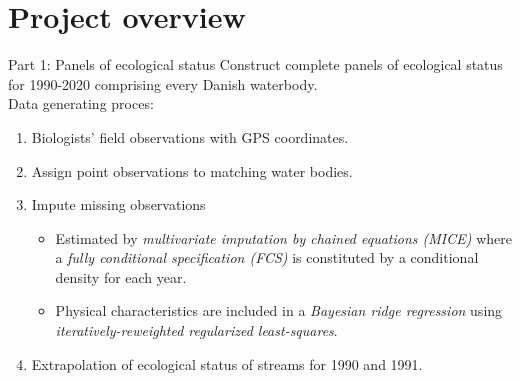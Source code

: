 \section{Project overview}

\begin{frame}{Part 1: Panels of ecological status}
  Construct complete panels of ecological status for 1990-2020 comprising every Danish waterbody.\\\bigskip
  Data generating proces:
  \begin{enumerate}
    \item Biologists' field observations with GPS coordinates.
    \item Assign point observations to matching water bodies.
    \item Impute missing observations
    \begin{itemize}
      \item Estimated by \textit{multivariate imputation by chained equations (MICE)} where a \textit{fully conditional specification (FCS)} is constituted by a conditional density for each year.
      \item Physical characteristics are included in a \textit{Bayesian ridge regression} using \textit{iteratively-reweighted regularized least-squares}.
    \end{itemize}
    \item Extrapolation of ecological status of streams for 1990 and 1991.
  \end{enumerate}
\end{frame}

